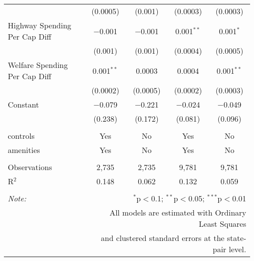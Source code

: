 \begin{table}[!htbp]
\begin{tabular}{@{\extracolsep{5pt}}lcccc}
  & (0.0005) & (0.001) & (0.0003) & (0.0003) \\ 
  Highway Spending Per Cap Diff & $-$0.001 & $-$0.001 & 0.001$^{**}$ & 0.001$^{*}$ \\ 
  & (0.001) & (0.001) & (0.0004) & (0.0005) \\ 
  Welfare Spending Per Cap Diff & 0.001$^{**}$ & 0.0003 & 0.0004 & 0.001$^{**}$ \\ 
  & (0.0002) & (0.0005) & (0.0002) & (0.0003) \\ 
  Constant & $-$0.079 & $-$0.221 & $-$0.024 & $-$0.049 \\ 
  & (0.238) & (0.172) & (0.081) & (0.096) \\ 
 \hline \\[-1.8ex] 
controls & Yes & No & Yes & No \\ 
amenities & Yes & No & Yes & No \\ 
\hline \\[-1.8ex] 
Observations & 2,735 & 2,735 & 9,781 & 9,781 \\ 
R$^{2}$ & 0.148 & 0.062 & 0.132 & 0.059 \\ 
\hline 
\hline \\[-1.8ex] 
\textit{Note:}  & \multicolumn{4}{r}{$^{*}$p$<$0.1; $^{**}$p$<$0.05; $^{***}$p$<$0.01} \\ 
 & \multicolumn{4}{r}{All models are estimated with Ordinary Least Squares} \\ 
 & \multicolumn{4}{r}{and clustered standard errors at the state-pair level.} \\ 
\end{tabular} 
\end{table} 
